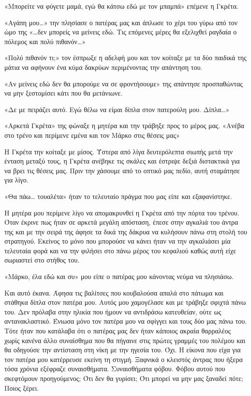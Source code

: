 \documentclass[12pt,twoside, openany]{book}
\begin{document}
«Μπορείτε να φύγετε μαμά, εγώ θα κάτσω εδώ με τον μπαμπά» επέμενε η Γκρέτα.

«Αγάπη μου…» την πλησίασε ο πατέρας μας και άπλωσε το χέρι του γύρω από τον ώμο της «…δεν μπορείς να μείνεις εδώ. Τις επόμενες μέρες θα εξελιχθεί ραγδαία ο πόλεμος και πολύ πιθανόν…»

«Πολύ πιθανόν τι;» τον έσπρωξε η αδελφή μου και τον κοίταξε με τα δύο παιδικά της μάτια να αφήνουν ένα κύμα δακρύων περιμένοντας την απάντηση του.

«Αν μείνεις εδώ δεν θα μπορούμε να σε φροντήσουμε» της απάντησε προσπαθώντας να μην ξεστομίσει κάτι που θα μετάνιωνε.

«Δε με πειράζει αυτό. Εγώ θέλω να είμαι δίπλα στον πατερούλη μου. Δίπλα…»

«Αρκετά Γκρέτα» της φώναξε η μητέρα και την τράβηξε προς το μέρος μας. «Ανέβα στο τρένο και περίμενε εμένα και τον Μάρκο στις θέσεις μας»

Η Γκρέτα την κοίταξε με μίσος. Ύστερα από λίγα δευτερόλεπτα σιωπής  μετά την ένταση μεταξύ τους, η Γκρέτα ανέβηκε τις σκάλες και έστριψε δεξιά διστακτικά για να βρει τις θέσεις μας. Πριν την χάσουμε από το οπτικό μας πεδίο, αυτή σταμάτησε για λίγο.

«Θα πάω… τουαλέτα» ήταν το τελευταίο πράγμα που μας είπε και εξαφανίστηκε.

Η μητέρα μου περίμενε λίγο να απομακρυνθεί η Γκρέτα από την πόρτα του τρένου. Όταν έκρινε πως ήταν σε αρκετά μεγάλη απόσταση, έπεσε στην αγκαλιά του άντρα της και με την σειρά της άφησε τα δικά της δάκρυα να κυλήσουν πάνω στη στολή του στρατηγού. Εκείνος το μόνο που μπορούσε να κάνει ήταν να την αγκαλιάσει μία τελευταία φορά και να την φιλήσει στο πάνω μέρος του κεφαλιού καθώς αυτή είχε σωριαστεί στο στήθος του.

«Μάρκο, έλα εδώ και συ» μου είπε ο πατέρας μου κάνοντας νεύμα να πλησιάσω.

Και αυτό έκανα. Άφησα τις βαλίτσες που κουβαλούσα απαλά στο πάτωμα και στάθηκα δίπλα στον πατέρα μου. Αυτός μου χαμογέλασε και με τράβηξε σφιχτά πάνω του. Δεν πρόλαβα στην ηλικία που ήμουν να αντιδράσω κατευθείαν, ούτε ως αντανακλαστικό. Ένιωσα μόνο τον πατέρα μου να σφίγγει και τους δύο μας πάνω του. Τότε ήταν που κατάλαβα ότι ο πατέρας μας δεν ήταν κάποιος ακραία θαρραλέος χωρίς κανένα άλλο συναίσθημα που θα πήγαινε στις πρώτες γραμμές του πολέμου και θα οδηγούσε την αντίσταση στη νίκη με την ηγεσία του. Όχι. Η είκονα που είχα για τον πατέρα μου κατέρρευσε εκείνη τη στιγμή. Ξαφνικά ο κλειστός άντρας που ήξερα τόσα χρόνια εξέφραζε συναισθήματα. Συναισθήματα φόβου. Φόβου αυτού που σκεφτόμουν προηγούμενος; Ότι δεν θα γυρίσει; Ότι μπορεί να μην μας ξαναδεί πότε; Ποιος ξέρει. 
\end{document}
